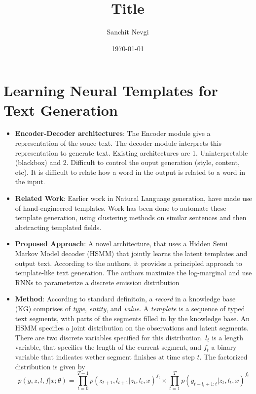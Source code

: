 \documentclass[12pt]{article}
\begin{document}
\title{\textbf{\huge{Title}}}

\date{\today}
\author{Sanchit Nevgi}

\section*{Learning Neural Templates for Text Generation}

\begin{itemize}[leftmargin=*,label={}]

\item \textbf{Encoder-Decoder architectures}:
The Encoder module give a representation of the souce text. The decoder module interprets this representation to generate text.
Existing architectures are 1. Uninterpretable (blackbox) and 2. Difficult to control the ouput generation (style, content, etc). It is difficult to relate how a word in the output is related to a word in the input.
\item \textbf{Related Work}: Earlier work in Natural Language generation, have made use of hand-engineered templates. Work has been done to automate these template generation, using clustering methods on similar sentences and then abstracting templated fields.
\item \textbf{Proposed Approach}: A novel architecture, that uses a Hidden Semi Markov Model decoder (HSMM) that jointly learns the latent templates and output text. According to the authors, it provides a principled approach to template-like text generation. The authors maximize the log-marginal and use RNNs to parameterize a discrete emission distribution
\item \textbf{Method}: According to standard definitoin, a \textit{record} in a knowledge base (KG) comprises of \textit{type}, \textit{entity}, and \textit{value}. A \textit{template} is a sequence of typed text segments, with parts of the segments filled in by the knowledge base. 
An HSMM specifies a joint distribution on the observations and latent segments. There are two discrete variables specified for this distribution. $l_t$ is a length variable, that specifies the length of the current segment, and $f_t$ a binary variable that indicates wether segment finishes at time step $t$. The factorized distribution is given by
\begin{equation}
    p(y,z,l,f|x;\theta) = \prod\limits_{t=0}^{T-1} p(z_{t+1}, l_{t+1}|z_t,l_t,x)^{f_t} \times \prod\limits_{t=1}^{T} p(y_{t - l_t + 1:t} | z_t, l_t, x)^{f_t}
\end{equation}


\end{itemize}
\end{document}

